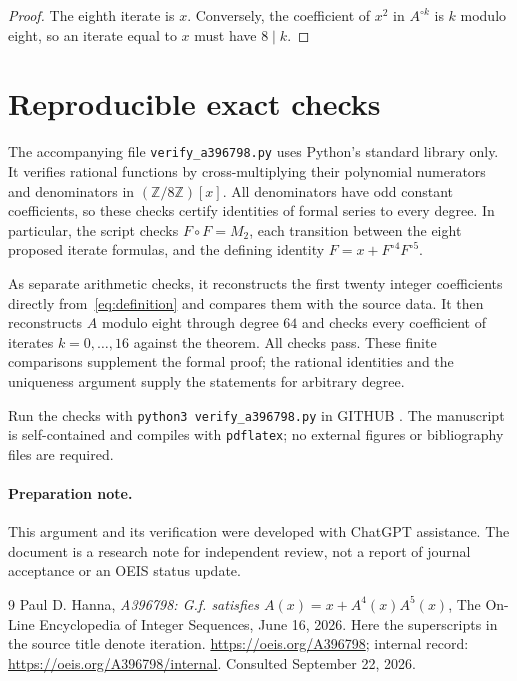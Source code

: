 \documentclass[11pt]{article}
\theoremstyle{remark}
\newcommand{\Z}{\mathbb Z}
\newcommand{\itn}[2]{{#1}^{\circ #2}}
\begin{document}
\begin{proof}
The eighth iterate is $x$. Conversely, the coefficient of $x^2$ in
$\itn{A}{k}$ is $k$ modulo eight, so an iterate equal to $x$ must
have $8\mid k$.
\end{proof}

\section{Reproducible exact checks}

The accompanying file \texttt{verify\_a396798.py} uses Python's standard
library only. It verifies rational functions by cross-multiplying their
polynomial numerators and denominators in $(\Z/8\Z)[x]$. All denominators
have odd constant coefficients, so these checks certify identities of
formal series to every degree. In particular, the script checks
$F\circ F=M_2$, each transition between the eight proposed iterate
formulas, and the defining identity $F=x+\itn{F}{4}\itn{F}{5}$.

As separate arithmetic checks, it reconstructs the first twenty integer
coefficients directly from~\eqref{eq:definition} and compares them with
the source data. It then reconstructs $A$ modulo eight through degree
$64$ and checks every coefficient of iterates $k=0,\ldots,16$ against
the theorem. All checks pass. These finite comparisons supplement the
formal proof; the rational identities and the uniqueness argument supply
the statements for arbitrary degree.

Run the checks with \texttt{python3 verify\_a396798.py} in GITHUB \url{}. The manuscript
is self-contained and compiles with \texttt{pdflatex}; no external
figures or bibliography files are required.

\paragraph{Preparation note.}
This argument and its verification were developed with ChatGPT assistance.
The document is a research note for independent review, not a report of
journal acceptance or an OEIS status update.

\begin{thebibliography}{9}
Paul D. Hanna,
\emph{A396798: G.f. satisfies $A(x)=x+A^4(x)A^5(x)$},
The On-Line Encyclopedia of Integer Sequences, June 16, 2026.
Here the superscripts in the source title denote iteration.
\url{https://oeis.org/A396798}; internal record:
\url{https://oeis.org/A396798/internal}.
Consulted September 22, 2026.
\end{thebibliography}
\end{document}
